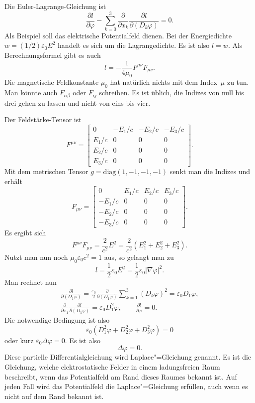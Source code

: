 \documentclass[a4paper,10pt,fleqn,twocolumn,twoside]{article}
\begin{document}
Die Euler-Lagrange-Gleichung ist
\[\frac{\partial l}{\partial\varphi}
- \sum_{k=0}^3 \frac{\partial}{\partial x_k}
\frac{\partial l}{\partial (D_k\varphi)}=0.\]
Als Beispiel soll das elektrische Potentialfeld dienen.
Bei der Energiedichte $w=(1/2)\varepsilon_0 E^2$ handelt es sich
um die Lagrangedichte. Es ist also $l=w$.
Als Berechnungsformel gibt es auch
\[l = -\frac{1}{4\mu_0} F^{\mu\nu}F_{\mu\nu}.\]
Die magnetische Feldkonstante $\mu_0$ hat natürlich nichts
mit dem Index~$\mu$ zu tun. Man könnte auch $F_{\alpha\beta}$
oder $F_{ij}$ schreiben. Es ist üblich, die Indizes von null bis
drei gehen zu lassen und nicht von eins bis vier.

Der Feldstärke-Tensor ist
\[F^{\mu\nu} = \begin{bmatrix}
0 & -E_1/c & -E_2/c & -E_3/c\\
E_1/c & 0 & 0 & 0\\
E_2/c & 0 & 0 & 0\\
E_3/c & 0 & 0 & 0
\end{bmatrix}.\]
Mit dem metrischen Tensor $g=\mathrm{diag}(1,-1,-1,-1)$ senkt man
die Indizes und erhält
\[F_{\mu\nu} = \begin{bmatrix}
0 & E_1/c & E_2/c & E_3/c\\
-E_1/c & 0 & 0 & 0\\
-E_2/c & 0 & 0 & 0\\
-E_3/c & 0 & 0 & 0
\end{bmatrix}.\]
Es ergibt sich
\[F^{\mu\nu}F_{\mu\nu} = \frac{2}{c^2} E^2
= \frac{2}{c^2} (E_1^2+E_2^2+E_3^2).\]
Nutzt man nun noch $\mu_0\varepsilon_0 c^2=1$ aus, so gelangt man zu
\[l = \frac{1}{2}\varepsilon_0 E^2
= \frac{1}{2}\varepsilon_0 |\nabla\varphi|^2.\]
Man rechnet nun
\begin{gather*}
\frac{\partial l}{\partial(D_1\varphi)}
= \frac{\varepsilon_0}{2} \frac{\partial}{\partial(D_1\varphi)}
\sum_{k=1}^3 (D_k\varphi)^2 = \varepsilon_0 D_1\varphi,\\
\frac{\partial}{\partial x_1}\frac{\partial l}{\partial(D_1\varphi)}
= \varepsilon_0 D_1^2\varphi,\qquad
\frac{\partial l}{\partial\varphi} = 0.
\end{gather*}
Die notwendige Bedingung ist also
\[\varepsilon_0 (D_1^2\varphi+D_2^2\varphi+D_3^2\varphi) = 0\]
oder kurz $\varepsilon_0 \Delta\varphi=0$. Es ist also
\[\Delta\varphi=0.\]
Diese partielle Differentialgleichung wird Laplace"=Gleichung genannt.
Es ist die Gleichung, welche elektrostatische Felder in einem
ladungsfreien Raum beschreibt, wenn das Potentialfeld am Rand dieses
Raumes bekannt ist. Auf jeden Fall wird das Potentialfeld die
Laplace"=Gleichung erfüllen, auch wenn es nicht auf dem Rand
bekannt ist.
\end{document}
